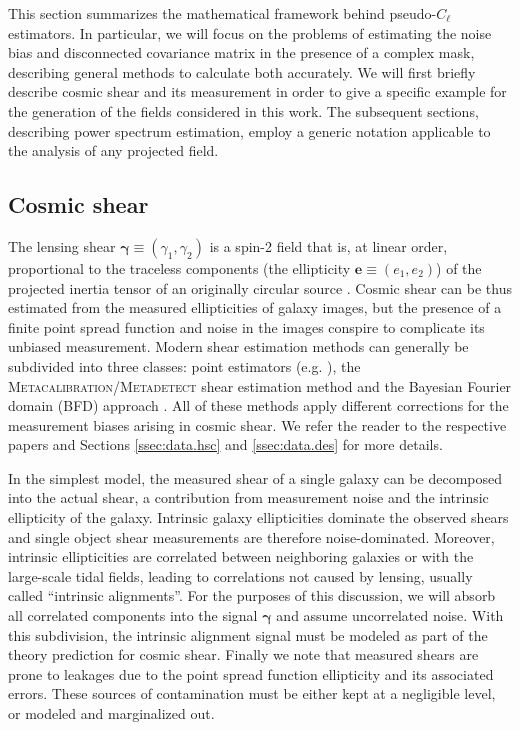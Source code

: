 \documentclass[a4paper,11pt]{article}
\newcommand{\shear}{\boldsymbol{\gamma}}
\newcommand{\ellip}{\boldsymbol{e}}
\newcommand{\mcal}{\textsc{Metacalibration}}
\begin{document}
    This section summarizes the mathematical framework behind pseudo-$C_\ell$ estimators. In particular, we will focus on the problems of estimating the noise bias and disconnected covariance matrix in the presence of a complex mask, describing general methods to calculate both accurately. We will first briefly describe cosmic shear and its measurement in order to give a specific example for the generation of the fields considered in this work. The subsequent sections, describing power spectrum estimation, employ a generic notation applicable to the analysis of any projected field.

    \subsection{Cosmic shear}\label{ssec:pcl.shear}
    
        The lensing shear $\shear\equiv(\gamma_1,\gamma_2)$ is a spin-2 field that is, at linear order, proportional to the traceless components (the ellipticity $\ellip\equiv(e_1,e_2)$) of the projected inertia tensor of an originally circular source \cite{astro-ph/9912508}. Cosmic shear can be thus estimated from the measured ellipticities of galaxy images, but the presence of a finite point spread function and noise in the images conspire to complicate its unbiased measurement. Modern shear estimation methods can generally be subdivided into three classes: point estimators (e.g. \cite{astro-ph/9411005}), the \mcal{}/\textsc{Metadetect} shear estimation method \cite{1702.02600, 1911.02505} and the Bayesian Fourier domain (BFD) approach \cite{1304.1843}. All of these methods apply different corrections for the measurement biases arising in cosmic shear. We refer the reader to the respective papers and Sections \ref{ssec:data.hsc} and \ref{ssec:data.des} for more details. 
        
        In the simplest model, the measured shear of a single galaxy can be decomposed into the actual shear, a contribution from measurement noise and the intrinsic ellipticity of the galaxy. Intrinsic galaxy ellipticities dominate the observed shears and single object shear measurements are therefore noise-dominated. Moreover, intrinsic ellipticities are correlated between neighboring galaxies or with the large-scale tidal fields, leading to correlations not caused by lensing, usually called ``intrinsic alignments''. For the purposes of this discussion, we will absorb all correlated components into the signal $\shear$ and assume uncorrelated noise. With this subdivision, the intrinsic alignment signal must be modeled as part of the theory prediction for cosmic shear. Finally we note that measured shears are prone to leakages due to the point spread function ellipticity and its associated errors. These sources of contamination must be either kept at a negligible level, or modeled and marginalized out.
        
\end{document}
